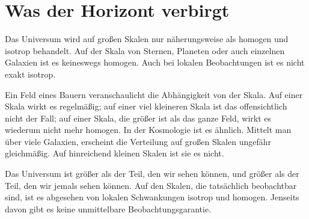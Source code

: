 \begin{classroomqa}
\end{classroomqa}

\begin{classroomqa}
\end{classroomqa}

\section{Was der Horizont verbirgt}

Das Universum wird auf großen Skalen nur näherungsweise als homogen und isotrop behandelt. Auf der Skala von Sternen, Planeten oder auch einzelnen Galaxien ist es keineswegs homogen. Auch bei lokalen Beobachtungen ist es nicht exakt isotrop.

Ein Feld eines Bauern veranschaulicht die Abhängigkeit von der Skala. Auf einer Skala wirkt es regelmäßig; auf einer viel kleineren Skala ist das offensichtlich nicht der Fall; auf einer Skala, die größer ist als das ganze Feld, wirkt es wiederum nicht mehr homogen. In der Kosmologie ist es ähnlich. Mittelt man über viele Galaxien, erscheint die Verteilung auf großen Skalen ungefähr gleichmäßig. Auf hinreichend kleinen Skalen ist sie es nicht.

Das Universum ist größer als der Teil, den wir sehen können, und größer als der Teil, den wir jemals sehen können. Auf den Skalen, die tatsächlich beobachtbar sind, ist es abgesehen von lokalen Schwankungen isotrop und homogen. Jenseits davon gibt es keine unmittelbare Beobachtungsgarantie.

